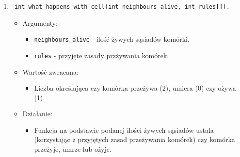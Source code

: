 \documentclass[a4paper,11pt, notitlepage ]{article}
\begin{document}
\begin{enumerate}
\item \begin{verbatim} int what_happens_with_cell(int neighbours_alive, int rules[]). \end{verbatim}
\begin{itemize}
\item Argumenty:
\begin{itemize}
\item \verb+neighbours_alive+ - ilość żywych sąsiadów komórki,
\item \verb+rules+ - przyjęte zasady przżywania komórek.
\end{itemize}
\item Wartość zwracana:
\begin{itemize}
\item Liczba określająca czy komórka przeżywa (2), umiera (0) czy ożywa (1).
\end{itemize}
\item Działanie:
\begin{itemize}
\item Funkcja na podstawie podanej ilości żywych sąsiadów ustala (korzystając z przyjętych zasad przeżywania komórek) czy komórka przeżyje, umrze lub ożyje.
\end{itemize}
\end{itemize}

\end{enumerate}
\end{document}
